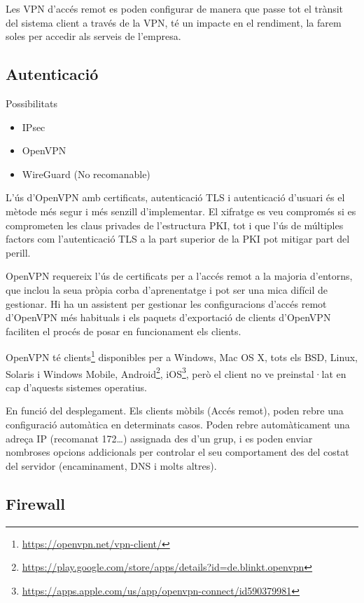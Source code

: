 \documentclass[
  10pt,
]{krantz}
\DeclareRobustCommand{\href}[2]{#2\footnote{\url{#1}}}
\providecommand{\tightlist}{%
  \setlength{\itemsep}{0pt}\setlength{\parskip}{0pt}}
\begin{document}
Les VPN d'accés remot es poden configurar de manera que passe tot el trànsit del sistema client a través de la VPN, té un impacte en el rendiment, la farem soles per accedir als serveis de l'empresa.

\hypertarget{autenticaciuxf3}{%
\subsection{Autenticació}\label{autenticaciuxf3}}

Possibilitats

\begin{itemize}
\tightlist
\item
  IPsec
\item
  OpenVPN
\item
  WireGuard (No recomanable)
\end{itemize}

L'ús d'OpenVPN amb certificats, autenticació TLS i autenticació d'usuari és el mètode més segur i més senzill d'implementar. El xifratge es veu compromés si es comprometen les claus privades de l'estructura PKI, tot i que l'ús de múltiples factors com l'autenticació TLS a la part superior de la PKI pot mitigar part del perill.

OpenVPN requereix l'ús de certificats per a l'accés remot a la majoria d'entorns, que inclou la seua pròpia corba d'aprenentatge i pot ser una mica difícil de gestionar. Hi ha un assistent per gestionar les configuracions d'accés remot d'OpenVPN més habituals i els paquets d'exportació de clients d'OpenVPN faciliten el procés de posar en funcionament els clients.

OpenVPN té \href{https://openvpn.net/vpn-client/}{clients} disponibles per a Windows, Mac OS X, tots els BSD, Linux, Solaris i Windows Mobile, \href{https://play.google.com/store/apps/details?id=de.blinkt.openvpn}{Android}, \href{https://apps.apple.com/us/app/openvpn-connect/id590379981}{iOS}, però el client no ve preinstal·lat en cap d'aquests sistemes operatius.

En funció del desplegament. Els clients mòbils (Accés remot), poden rebre una configuració automàtica en determinats casos. Poden rebre automàticament una adreça IP (recomanat 172\ldots) assignada des d'un grup, i es poden enviar nombroses opcions addicionals per controlar el seu comportament des del costat del servidor (encaminament, DNS i molts altres).

\hypertarget{firewall-1}{%
\subsection{Firewall}\label{firewall-1}}
\end{document}
